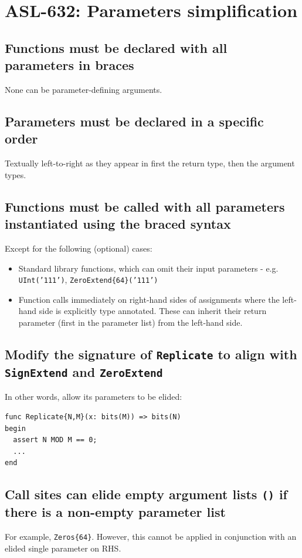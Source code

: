 \section{ASL-632: Parameters simplification}

\subsection{Functions must be declared with all parameters in braces}
None can be parameter-defining arguments.

\subsection{Parameters must be declared in a specific order}

Textually left-to-right as they appear in first the return type, then the
argument types.

\subsection{Functions must be called with all parameters instantiated using the braced syntax}
Except for the following (optional) cases:
\begin{itemize}
\item Standard library functions, which can omit their input parameters -
e.g. \texttt{UInt('111')}, \texttt{ZeroExtend\{64\}('111')}
\item Function calls immediately on right-hand sides of assignments where
the left-hand side is explicitly type annotated. These can inherit their
return parameter (first in the parameter list) from the left-hand side.
\end{itemize}

\subsection{Modify the signature of \texttt{Replicate} to align with \texttt{SignExtend} and \texttt{ZeroExtend}}

In other words, allow its parameters to be elided:
\begin{verbatim}
func Replicate{N,M}(x: bits(M)) => bits(N)
begin
  assert N MOD M == 0;
  ...
end
\end{verbatim}

\subsection{Call sites can elide empty argument lists \texttt{()} if
there is a non-empty parameter list}
For example, \texttt{Zeros\{64\}}. However, this cannot
be applied in conjunction with an elided single parameter on RHS.

